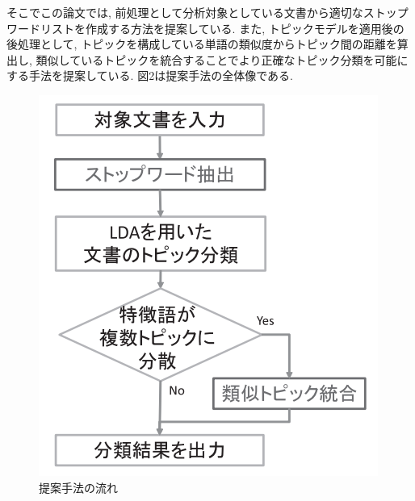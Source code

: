 \documentclass{ltjarticle}
\begin{document}
そこでこの論文では, 前処理として分析対象としている文書から適切なストップワードリストを作成する方法を提案している. 
また, トピックモデルを適用後の後処理として, トピックを構成している単語の類似度からトピック間の距離を算出し, 
類似しているトピックを統合することでより正確なトピック分類を可能にする手法を提案している. 図2は提案手法の全体像である. 
\begin{figure}[h]
    \centering
    \includegraphics[]{images/fig2.png}
    \caption{提案手法の流れ}
\end{figure}
\end{document}
